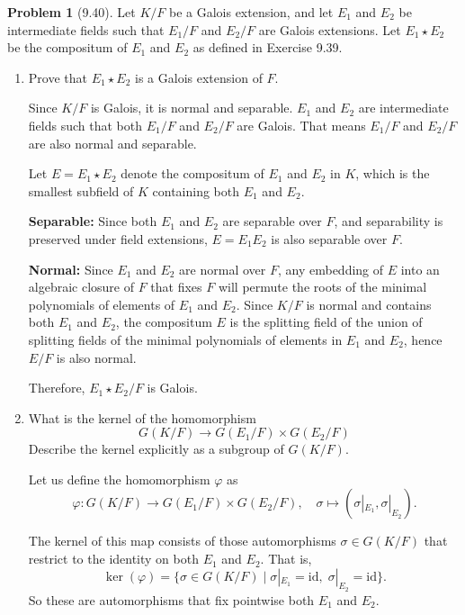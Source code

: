 \documentclass[12pt]{article}
\theoremstyle{definition}
\newtheorem{problem}{Problem}
\begin{document}
\begin{problem}[9.40]
    Let $K/F$ be a Galois extension, and let $E_1$ and $E_2$ be intermediate fields such that $E_1/F$ and $E_2/F$
    are Galois extensions. Let $E_1 \star E_2$ be the compositum of $E_1$ and $E_2$ as defined in Exercise 9.39.
    \begin{enumerate}[label=(\alph*)]
        \item Prove that $E_1 \star E_2$ is a Galois extension of $F$.
        
        \begin{solution}
            Since $K/F$ is Galois, it is normal and separable. $E_1$ and $E_2$ are intermediate fields such that both $E_1/F$ and $E_2/F$ are Galois. That means $E_1/F$ and $E_2/F$ are also normal and separable.

            Let $E = E_1 \star E_2$ denote the compositum of $E_1$ and $E_2$ in $K$, which is the smallest subfield of $K$ containing both $E_1$ and $E_2$.

            \textbf{Separable:} Since both $E_1$ and $E_2$ are separable over $F$, and separability is preserved under field extensions, $E = E_1 E_2$ is also separable over $F$.

            \textbf{Normal:} Since $E_1$ and $E_2$ are normal over $F$, any embedding of $E$ into an algebraic closure of $F$ that fixes $F$ will permute the roots of the minimal polynomials of elements of $E_1$ and $E_2$. Since $K/F$ is normal and contains both $E_1$ and $E_2$, the compositum $E$ is the splitting field of the union of splitting fields of the minimal polynomials of elements in $E_1$ and $E_2$, hence $E/F$ is also normal.

            Therefore, $E_1 \star E_2/F$ is Galois.
        \end{solution}

        \item What is the kernel of the homomorphism
              \[
                  G(K/F) \longrightarrow G(E_1/F) \times G(E_2/F)
              \]
              Describe the kernel explicitly as a subgroup of $G(K/F)$.
        
        \begin{solution}
            Let us define the homomorphism $\varphi$ as
            \[
                \varphi: G(K/F) \to G(E_1/F) \times G(E_2/F), \quad \sigma \mapsto (\sigma|_{E_1}, \sigma|_{E_2}).
            \]

            The kernel of this map consists of those automorphisms $\sigma \in G(K/F)$ that restrict to the identity on both $E_1$ and $E_2$. That is,
            \[
                \ker(\varphi) = \{ \sigma \in G(K/F) \mid \sigma|_{E_1} = \text{id}, \; \sigma|_{E_2} = \text{id} \}.
            \]
            So these are automorphisms that fix pointwise both $E_1$ and $E_2$.


\end{solution}
\end{enumerate}
\end{problem}
\end{document}
